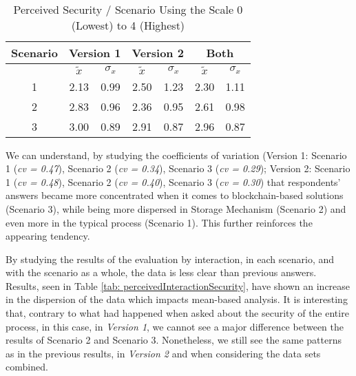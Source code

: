 \begin{table}[htb]
	\centering
	\caption{Perceived Security / Scenario Using the Scale 0 (Lowest) to 4 (Highest)}
	\label{tab: perceivedSecurity}
	\begin{tabular}{c|cccc|cc}
		\hline
		Scenario & \multicolumn{2}{c}{\bf Version 1} & \multicolumn{2}{c}{\bf Version 2} \vrule & \multicolumn{2}{c}{\bf Both}                                             \\
		\hline
		         & $\tilde{x}$                       & $\sigma_{x}$                             & $\tilde{x}$                  & $\sigma_{x}$ & $\tilde{x}$ & $\sigma_{x}$ \\
		\hline
		1        & 2.13                              & 0.99                                     & 2.50                         & 1.23         & 2.30        & 1.11         \\
		2        & 2.83                              & 0.96                                     & 2.36                         & 0.95         & 2.61        & 0.98         \\
		3        & 3.00                              & 0.89                                     & 2.91                         & 0.87         & 2.96        & 0.87         \\
		\hline
	\end{tabular}
\end{table}

We can understand, by studying the coefficients of variation (Version 1: Scenario 1 (\textit{cv = 0.47}), Scenario 2 (\textit{cv = 0.34}), Scenario 3 (\textit{cv = 0.29}); Version 2: Scenario 1 (\textit{cv = 0.48}), Scenario 2 (\textit{cv = 0.40}), Scenario 3 (\textit{cv = 0.30}) that respondents' answers became more concentrated when it comes to blockchain-based solutions (Scenario 3), while being more dispersed in Storage Mechanism (Scenario 2) and even more in the typical process (Scenario 1). This further reinforces the appearing tendency.

By studying the results of the evaluation by interaction, in each scenario, and with the scenario as a whole, the data is less clear than previous answers. Results, seen in Table \ref{tab: perceivedInteractionSecurity}, have shown an increase in the dispersion of the data which impacts mean-based analysis. It is interesting that, contrary to what had happened when asked about the security of the entire process, in this case, in \textit{Version 1}, we cannot see a major difference between the results of Scenario 2 and Scenario 3. Nonetheless, we still see the same patterns as in the previous results, in \textit{Version 2} and when considering the data sets combined.

